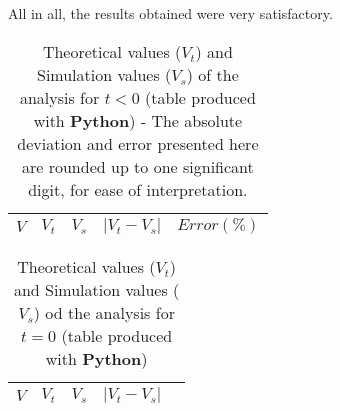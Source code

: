 
All in all, the results obtained were very satisfactory.

\begin{table}[H]
  \centering
  \begin{tabular}{|c|c|c|c|c|}
    \hline
        $V$ & $V_t$ & $V_s$ & $|V_t-V_s|$ & $Error (\%)$ \\
        \hline
        \hline
        
        \hline
  \end{tabular}
  \caption{Theoretical values ($V_t$) and Simulation values ($V_s$) of the analysis for $t < 0$ (table produced with {\bf Python}) - The absolute deviation and error presented here are rounded up to one significant digit, for ease of interpretation.}
  \label{error1_res}
\end{table}

\begin{table}[H]
  \centering
  \begin{tabular}{|c|c|c|c|c|}
    \hline
        $V$ & $V_t$ & $V_s$ & $|V_t-V_s|$ \\
        \hline
        \hline
        
        \hline
  \end{tabular}
  \caption{Theoretical values ($V_t$) and Simulation values ($V_s$) od the analysis for $t = 0$ (table produced with {\bf Python})}
  \label{error2_res}
\end{table}
